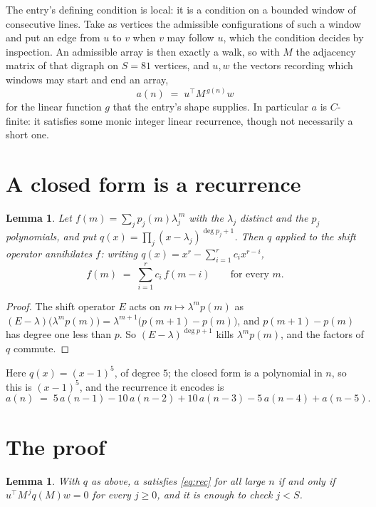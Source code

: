 \documentclass[11pt,a4paper]{article}
\theoremstyle{plain}
\newtheorem{lemma}[theorem]{Lemma}
\theoremstyle{definition}
\begin{document}
The entry's defining condition is local: it is a condition on a bounded window of consecutive lines. Take as vertices the
admissible configurations of such a window and put an edge from $u$ to $v$ when $v$ may
follow $u$, which the condition decides by inspection. An admissible array is then exactly a
walk, so with $M$ the adjacency matrix of that digraph on $S=81$ vertices, and $u,w$ the
vectors recording which windows may start and end an array,
\[
a(n)\;=\;u^{\!\top}M^{\,g(n)}w
\]
for the linear function $g$ that the entry's shape supplies. In particular $a$ is
$C$-finite: it satisfies some monic integer linear recurrence, though not necessarily a short
one.

\section{A closed form is a recurrence}

\begin{lemma}\label{lem:ann}
Let $f(m)=\sum_{j}p_j(m)\lambda_j^{\,m}$ with the $\lambda_j$ distinct and the $p_j$
polynomials, and put $q(x)=\prod_j(x-\lambda_j)^{\deg p_j+1}$. Then $q$ applied to the shift
operator annihilates $f$: writing $q(x)=x^{r}-\sum_{i=1}^{r}c_ix^{r-i}$,
\[
f(m)\;=\;\sum_{i=1}^{r}c_i\,f(m-i)\qquad\text{for every }m.
\]
\end{lemma}

\begin{proof}
The shift operator $E$ acts on $m\mapsto\lambda^{m}p(m)$ as
$(E-\lambda)\bigl(\lambda^{m}p(m)\bigr)=\lambda^{m+1}\bigl(p(m+1)-p(m)\bigr)$, and
$p(m+1)-p(m)$ has degree one less than $p$. So $(E-\lambda)^{\deg p+1}$ kills
$\lambda^{m}p(m)$, and the factors of $q$ commute.
\end{proof}

Here $q(x)=(x-1)^{5}$, of degree $5$; the closed form is a polynomial in $n$, so this is $(x-1)^{5}$, and the recurrence it encodes is
\begin{equation}\label{eq:rec}
a(n)\;=\;5\,a(n-1) - 10\,a(n-2) + 10\,a(n-3) - 5\,a(n-4) + a(n-5).
\end{equation}

\section{The proof}

\begin{lemma}\label{lem:crit}
With $q$ as above, $a$ satisfies \eqref{eq:rec} for all large $n$ if and only if
$u^{\!\top}M^{\,j}q(M)w=0$ for every $j\ge0$, and it is enough to check $j<S$.
\end{lemma}
\end{document}
